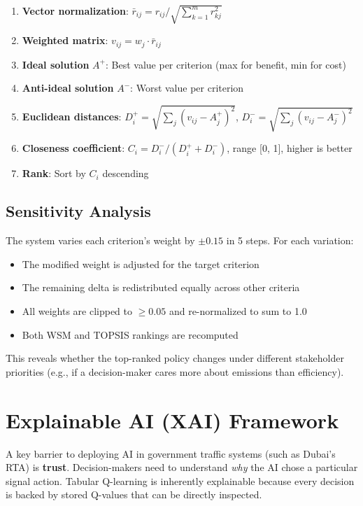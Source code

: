 \documentclass[12pt, a4paper]{article}
\begin{document}
\begin{enumerate}[nosep]
    \item \textbf{Vector normalization}: $\bar{r}_{ij} = r_{ij} / \sqrt{\sum_{k=1}^{m} r_{kj}^2}$
    \item \textbf{Weighted matrix}: $v_{ij} = w_j \cdot \bar{r}_{ij}$
    \item \textbf{Ideal solution} $A^+$: Best value per criterion (max for benefit, min for cost)
    \item \textbf{Anti-ideal solution} $A^-$: Worst value per criterion
    \item \textbf{Euclidean distances}: $D_i^+ = \sqrt{\sum_{j} (v_{ij} - A_j^+)^2}$, $D_i^- = \sqrt{\sum_{j} (v_{ij} - A_j^-)^2}$
    \item \textbf{Closeness coefficient}: $C_i = D_i^- / (D_i^+ + D_i^-)$, range [0, 1], higher is better
    \item \textbf{Rank}: Sort by $C_i$ descending
\end{enumerate}

\subsection{Sensitivity Analysis}

The system varies each criterion's weight by $\pm 0.15$ in 5 steps. For each variation:
\begin{itemize}[nosep]
    \item The modified weight is adjusted for the target criterion
    \item The remaining delta is redistributed equally across other criteria
    \item All weights are clipped to $\geq 0.05$ and re-normalized to sum to 1.0
    \item Both WSM and TOPSIS rankings are recomputed
\end{itemize}

This reveals whether the top-ranked policy changes under different stakeholder priorities (e.g., if a decision-maker cares more about emissions than efficiency).

\section{Explainable AI (XAI) Framework}

A key barrier to deploying AI in government traffic systems (such as Dubai's RTA) is \textbf{trust}. Decision-makers need to understand \textit{why} the AI chose a particular signal action. Tabular Q-learning is inherently explainable because every decision is backed by stored Q-values that can be directly inspected.
\end{document}

